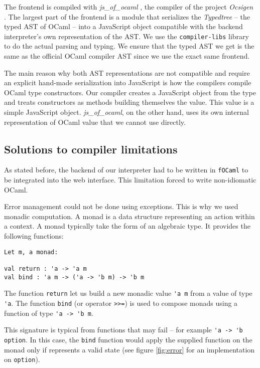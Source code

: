 \documentclass[twocolumn]{article}
\begin{document}
The frontend is compiled with \emph{js\_of\_ocaml}
\cite{DBLP:journals/spe/VouillonB14}, the compiler of the project
\emph{Ocsigen} \cite{balat:hal-00691710}. The largest part of the frontend is a
module that serializes the \emph{Typedtree} -- the typed AST of OCaml -- into a
JavaScript object compatible with the backend interpreter's own representation
of the AST. We use the \texttt{compiler-libs} library to do the actual parsing
and typing. We ensure that the typed AST we get is the same as the official
OCaml compiler AST since we use the exact same frontend.

The main reason why both AST representations are not compatible and require an
explicit hand-made serialization into JavaScript is how the compilers compile
OCaml type constructors. Our compiler creates a JavaScript object from the type
and treats constructors as methods building themselves the value. This value is
a simple JavaScript object. \emph{js\_of\_ocaml}, on the other hand, uses its
own internal representation of OCaml value that we cannot use directly.

\subsection{Solutions to compiler limitations}

As stated before, the backend of our interpreter had to be written in
\texttt{fOCaml} to be integrated into the web interface. This limitation forced
to write non-idiomatic OCaml.

Error management could not be done using exceptions. This is why we used monadic
computation. A monad is a data structure representing an action within a
context. A monad typically take the form of an algebraic type. It provides the
following functions:

\begin{verbatim}
Let m, a monad:

val return : 'a -> 'a m
val bind : 'a m -> ('a -> 'b m) -> 'b m
\end{verbatim}

The function \texttt{return} let us build a new monadic value \verb|'a m| from
a value of type \verb|'a|. The function \texttt{bind} (or operator \texttt{>>=}) is
used to compose monads using a function of type \verb|'a -> 'b m|.

This signature is typical from functions that may fail -- for example
\verb|'a -> 'b option|. In this case, the \texttt{bind} function would apply
the supplied function on the monad only if represents a valid state (see figure
\ref{fig:error} for an implementation on \texttt{option}).
\end{document}

